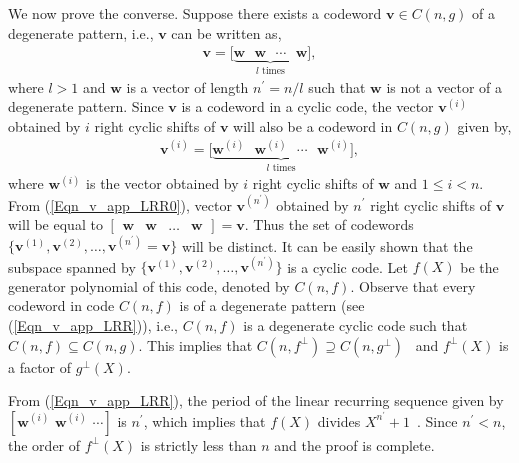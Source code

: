 \documentclass[10pt,journal]{IEEEtran}
\begin{document}
\begin{IEEEproof}
We now prove the converse. Suppose there exists a codeword $\mathbf{v} \in C(n,g)$ of a degenerate pattern, i.e.,
$\mathbf{v}$ can be written as,
% 
\begin{align}
% 
\mathbf{v} = \Big[\underbrace{\mathbf{w} \mbox{~~} \mathbf{w} \mbox{~~} \cdots \mbox{~~} \mathbf{w}}_{l \text{ times}}\Big],
\label{Eqn_v_app_LRR0}
% 
\end{align}
% 
where $l > 1$ and $\mathbf{w}$ is a vector of length $n^{\prime} = n/l$ such that
$\mathbf{w}$ is not a vector of a degenerate pattern.
% 
Since $\mathbf{v}$ is a codeword in a cyclic code, the vector $\mathbf{v}^{(i)}$ obtained by $i$ right cyclic shifts of 
$\mathbf{v}$ will also be a codeword in $C(n,g)$ given by,
% 
\begin{align}
% 
\mathbf{v}^{(i)} = \Big[\underbrace{\mathbf{w}^{(i)} \mbox{~~} \mathbf{w}^{(i)} \mbox{~~} \cdots \mbox{~~} \mathbf{w}^{(i)}}_{l \text{ times}}\Big],
\label{Eqn_v_app_LRR}
% 
\end{align}
% 
where $\mathbf{w}^{(i)}$ is the vector obtained by $i$ right cyclic shifts of $\mathbf{w}$ and $1 \leq i < n$.
From (\ref{Eqn_v_app_LRR0}), vector $\mathbf{v}^{(n^{\prime})}$ obtained by $n^{\prime}$ right cyclic shifts of $\mathbf{v}$
will be equal to $\begin{bmatrix} \mathbf{w} & \mathbf{w} & \ldots & \mathbf{w} \end{bmatrix} = \mathbf{v}$.
Thus the set of codewords $\{ \mathbf{v}^{(1)}, \mathbf{v}^{(2)}, \ldots, \mathbf{v}^{(n^{\prime})} = \mathbf{v} \}$
will be distinct.
It can be easily shown that the subspace spanned by $\{ \mathbf{v}^{(1)}, \mathbf{v}^{(2)}, \ldots, \mathbf{v}^{(n^{\prime})} \}$
is a cyclic code.
Let $f(X)$ be the generator polynomial of this code, denoted by $C(n,f)$.
Observe that every codeword in code $C(n,f)$ is of a degenerate pattern (see (\ref{Eqn_v_app_LRR})), i.e.,
$C(n,f)$ is a degenerate cyclic code such that $C(n,f) \subseteq C(n,g)$.
% 
This implies that $C(n,f^{\perp}) \supseteq C(n,g^{\perp})$~\cite{LinCostello2004} and 
$f^{\perp}(X)$ is a factor of $g^{\perp}(X)$.
% 

From (\ref{Eqn_v_app_LRR}), the period of the linear recurring sequence given by 
$[\mathbf{w}^{(i)} \mbox{~} \mathbf{w}^{(i)} \mbox{~} \cdots]$ is $n^{\prime}$, which implies that 
$f(X)$ divides $X^{n^{\prime}}+1$~\cite[Sec.~3.1]{Lidl86}. Since $n^{\prime} < n$, the order of $f^{\perp}(X)$
is strictly less than $n$ and the proof is complete.
% 
\end{IEEEproof}
% 
\end{document}
